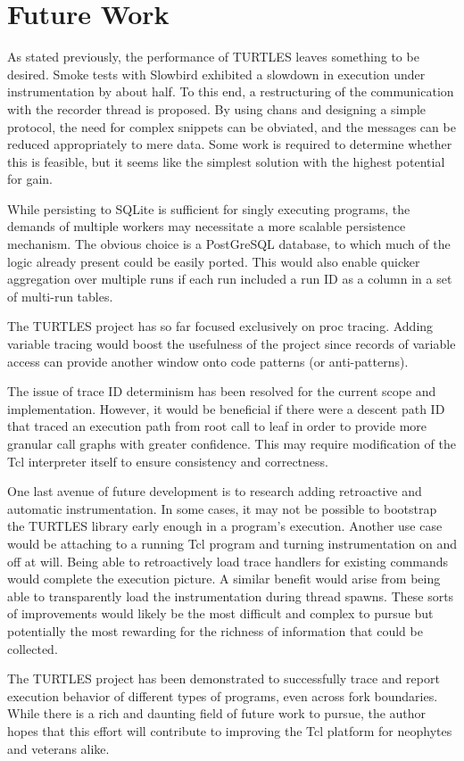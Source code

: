 \documentclass{article}[letter,10pt]
\begin{document}
\section{Future Work}{
  As stated previously, the performance of TURTLES leaves something to be desired. Smoke tests with Slowbird exhibited a slowdown
  in execution under instrumentation by about half. To this end, a restructuring of the communication with the recorder thread
  is proposed. By using chans and designing a simple protocol, the need for complex snippets can be obviated, and the messages
  can be reduced appropriately to mere data. Some work is required to determine whether this is feasible, but it seems like the
  simplest solution with the highest potential for gain.

  While persisting to SQLite is sufficient for singly executing programs, the demands of multiple workers may necessitate a
  more scalable persistence mechanism. The obvious choice is a PostGreSQL database, to which much of the logic already present
  could be easily ported. This would also enable quicker aggregation over multiple runs if each run included a run ID as a column
  in a set of multi-run tables.

  The TURTLES project has so far focused exclusively on proc tracing. Adding variable tracing would boost the usefulness of the
  project since records of variable access can provide another window onto code patterns (or anti-patterns).

  The issue of trace ID determinism has been resolved for the current scope and implementation. However, it would be beneficial
  if there were a descent path ID that traced an execution path from root call to leaf in order to provide more granular call graphs
  with greater confidence. This may require modification of the Tcl interpreter itself to ensure consistency and correctness.

  One last avenue of future development is to research adding retroactive and automatic instrumentation. In some cases, it may not
  be possible to bootstrap the TURTLES library early enough in a program's execution. Another use case would be attaching to
  a running Tcl program and turning instrumentation on and off at will. Being able to retroactively load trace handlers for
  existing commands would complete the execution picture. A similar benefit would arise from being able to transparently
  load the instrumentation during thread spawns. These sorts of improvements would likely be the most difficult and complex to pursue
  but potentially the most rewarding for the richness of information that could be collected.

  The TURTLES project has been demonstrated to successfully trace and report execution behavior of different types of programs,
  even across fork boundaries. While there is a rich and daunting field of future work to pursue, the author hopes that this
  effort will contribute to improving the Tcl platform for neophytes and veterans alike.
}

\printbibliography
\end{document}
